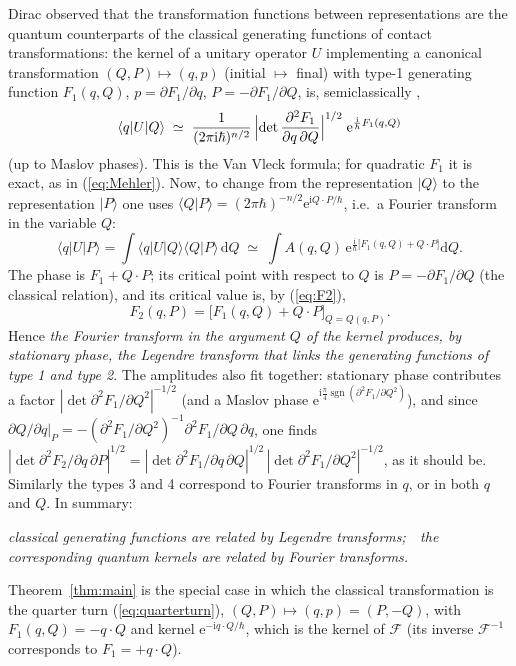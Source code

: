 \documentclass[11pt,a4paper]{article}
\newcommand{\ii}{\mathrm{i}}
\newcommand{\dd}{\mathrm{d}}
\newcommand{\ee}{\mathrm{e}}
\newcommand{\hb}{\hbar}
\newcommand{\sgn}{\operatorname{sgn}}
\newcommand{\bra}[1]{\langle #1|}
\newcommand{\ket}[1]{|#1\rangle}
\newcommand{\braket}[2]{\langle #1|#2\rangle}
\newcommand{\FT}{\mathcal{F}}
\theoremstyle{plain}
\theoremstyle{definition}
\theoremstyle{remark}
\begin{document}
Dirac observed that the transformation functions between representations are the quantum counterparts of the classical generating functions of contact transformations: the kernel of a unitary operator $U$ implementing a canonical transformation $(Q,P)\mapsto(q,p)$ (initial $\mapsto$ final) with type-1 generating function $F_1(q,Q)$, $p=\partial F_1/\partial q$, $P=-\partial F_1/\partial Q$, is, semiclassically \cite{Dirac27,Dirac,VanVleck,Schulman,Gutzwiller},
\begin{equation}\label{eq:VanVleck}
\bra{q}U\ket{Q}\;\simeq\;\frac{1}{(2\pi\ii\hb)^{n/2}}\,\Bigl|\det\frac{\partial^2F_1}{\partial q\,\partial Q}\Bigr|^{1/2}\;\ee^{\frac{\ii}{\hb}F_1(q,Q)}
\end{equation}
(up to Maslov phases). This is the Van Vleck formula; for quadratic $F_1$ it is exact, as in (\ref{eq:Mehler}). Now, to change from the representation $\ket{Q}$ to the representation $\ket{P}$ one uses $\braket{Q}{P}=(2\pi\hb)^{-n/2}\ee^{\ii Q\cdot P/\hb}$, i.e.\ a Fourier transform in the variable $Q$:
\begin{equation}
\bra{q}U\ket{P}=\int\bra{q}U\ket{Q}\braket{Q}{P}\,\dd Q\;\simeq\;\int A(q,Q)\,\ee^{\frac{\ii}{\hb}\bigl[F_1(q,Q)+Q\cdot P\bigr]}\dd Q .
\end{equation}
The phase is $F_1+Q\cdot P$; its critical point with respect to $Q$ is $P=-\partial F_1/\partial Q$ (the classical relation), and its critical value is, by (\ref{eq:F2}),
\begin{equation}
F_2(q,P)=\bigl[F_1(q,Q)+Q\cdot P\bigr]_{Q=Q(q,P)} .
\end{equation}
Hence \emph{the Fourier transform in the argument $Q$ of the kernel produces, by stationary phase, the Legendre transform that links the generating functions of type 1 and type 2}. The amplitudes also fit together: stationary phase contributes a factor $|\det\partial^2F_1/\partial Q^2|^{-1/2}$ (and a Maslov phase $\ee^{\ii\frac\pi4\sgn(\partial^2F_1/\partial Q^2)}$), and since $\partial Q/\partial q|_P=-(\partial^2F_1/\partial Q^2)^{-1}\partial^2F_1/\partial Q\,\partial q$, one finds $|\det\partial^2F_2/\partial q\,\partial P|^{1/2}=|\det\partial^2F_1/\partial q\,\partial Q|^{1/2}\,|\det\partial^2F_1/\partial Q^2|^{-1/2}$, as it should be. Similarly the types 3 and 4 correspond to Fourier transforms in $q$, or in both $q$ and $Q$. In summary:
\begin{center}
\emph{classical generating functions are related by Legendre transforms;\ \ the corresponding quantum kernels are related by Fourier transforms.}
\end{center}
\noindent Theorem~\ref{thm:main} is the special case in which the classical transformation is the quarter turn (\ref{eq:quarterturn}), $(Q,P)\mapsto(q,p)=(P,-Q)$, with $F_1(q,Q)=-q\cdot Q$ and kernel $\ee^{-\ii q\cdot Q/\hb}$, which is the kernel of $\FT$ (its inverse $\FT^{-1}$ corresponds to $F_1=+q\cdot Q$).
\end{document}
